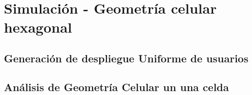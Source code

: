
\chapter{Simulación - Geometría celular hexagonal} %

\label{AppendixB} %

\section{Generación de despliegue Uniforme de usuarios}

\section{Análisis de Geometría Celular un una celda}